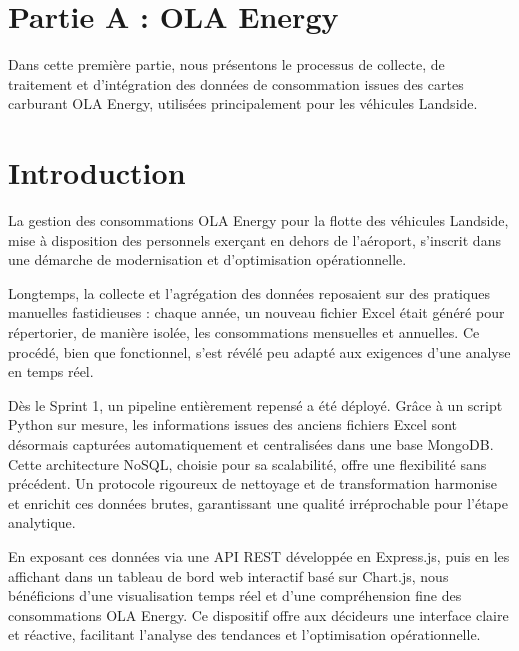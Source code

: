 \documentclass[a4paper,11pt]{report}
\begin{document}
\vspace{2em}





\newpage
\section*{Partie A : OLA Energy}

\vspace{1em}
\noindent
Dans cette première partie, nous présentons le processus de collecte, de traitement et d'intégration des données de consommation issues des cartes carburant OLA Energy, utilisées principalement pour les véhicules Landside.\\

\setcounter{section}{0}

\section{Introduction}

La gestion des consommations OLA Energy pour la flotte des véhicules Landside, mise à disposition des personnels exerçant en dehors de l’aéroport, s’inscrit dans une démarche de modernisation et d’optimisation opérationnelle.

Longtemps, la collecte et l’agrégation des données reposaient sur des pratiques manuelles fastidieuses : chaque année, un nouveau fichier Excel était généré pour répertorier, de manière isolée, les consommations mensuelles et annuelles. Ce procédé, bien que fonctionnel, s’est révélé peu adapté aux exigences d’une analyse en temps réel.

Dès le Sprint 1, un pipeline entièrement repensé a été déployé. Grâce à un script Python sur mesure, les informations issues des anciens fichiers Excel sont désormais capturées automatiquement et centralisées dans une base MongoDB. Cette architecture NoSQL, choisie pour sa scalabilité, offre une flexibilité sans précédent. Un protocole rigoureux de nettoyage et de transformation harmonise et enrichit ces données brutes, garantissant une qualité irréprochable pour l’étape analytique.

En exposant ces données via une API REST développée en Express.js, puis en les affichant dans un tableau de bord web interactif basé sur Chart.js, nous bénéficions d’une visualisation temps réel et d’une compréhension fine des consommations OLA Energy. Ce dispositif offre aux décideurs une interface claire et réactive, facilitant l’analyse des tendances et l’optimisation opérationnelle.
\end{document}
